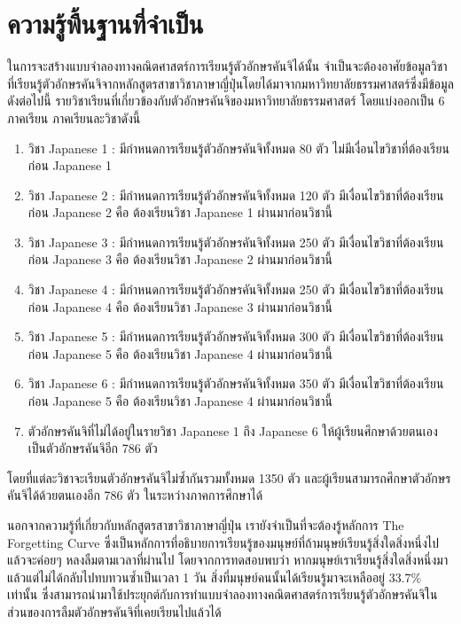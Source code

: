 \documentclass{article}
\begin{document}
\section{ความรู้พื้นฐานที่จำเป็น}
ในการจะสร้างแบบจำลองทางคณิตศาสตร์การเรียนรู้ตัวอักษรคันจิได้นั้น จำเป็นจะต้องอาศัยข้อมูลวิชาที่เรียนรู้ตัวอักษรคันจิจากหลักสูตรสาขาวิชาภาษาญี่ปุ่นโดยได้มาจากมหาวิทยาลัยธรรมศาสตร์ซึ่งมีข้อมูลดังต่อไปนี้ 
\break
รายวิชาเรียนที่เกี่ยวข้องกับตัวอักษรคันจิของมหาวิทยาลัยธรรมศาสตร์ โดยแบ่งออกเป็น 6 ภาคเรียน ภาคเรียนละวิชาดังนี้
\begin{enumerate}
	\item วิชา Japanese 1 : มีกำหนดการเรียนรู้ตัวอักษรคันจิทั้งหมด 80 ตัว ไม่มีเงื่อนไขวิชาที่ต้องเรียนก่อน Japanese 1
	\item วิชา Japanese 2 : มีกำหนดการเรียนรู้ตัวอักษรคันจิทั้งหมด 120 ตัว มีเงื่อนไขวิชาที่ต้องเรียนก่อน Japanese 2 คือ ต้องเรียนวิชา Japanese 1 ผ่านมาก่อนวิชานี้
	\item วิชา Japanese 3 : มีกำหนดการเรียนรู้ตัวอักษรคันจิทั้งหมด 250 ตัว มีเงื่อนไขวิชาที่ต้องเรียนก่อน Japanese 3 คือ ต้องเรียนวิชา Japanese 2 ผ่านมาก่อนวิชานี้
	\item วิชา Japanese 4 : มีกำหนดการเรียนรู้ตัวอักษรคันจิทั้งหมด 250 ตัว มีเงื่อนไขวิชาที่ต้องเรียนก่อน Japanese 4 คือ ต้องเรียนวิชา Japanese 3 ผ่านมาก่อนวิชานี้
	\item วิชา Japanese 5 : มีกำหนดการเรียนรู้ตัวอักษรคันจิทั้งหมด 300 ตัว มีเงื่อนไขวิชาที่ต้องเรียนก่อน Japanese 5 คือ ต้องเรียนวิชา Japanese 4 ผ่านมาก่อนวิชานี้
	\item วิชา Japanese 6 : มีกำหนดการเรียนรู้ตัวอักษรคันจิทั้งหมด 350 ตัว มีเงื่อนไขวิชาที่ต้องเรียนก่อน Japanese 5 คือ ต้องเรียนวิชา Japanese 4 ผ่านมาก่อนวิชานี้
	\item ตัวอักษรคันจิที่ไม่ได้อยู่ในรายวิชา Japanese 1 ถึง Japanese 6 ให้ผู้เรียนศึกษาด้วยตนเองเป็นตัวอักษรคันจิอีก 786 ตัว
\end{enumerate}
โดยที่แต่ละวิชาจะเรียนตัวอักษรคันจิไม่ซ้ำกันรวมทั้งหมด 1350 ตัว และผู้เรียนสามารถศึกษาตัวอักษรคันจิได้ด้วยตนเองอีก 786 ตัว ในระหว่างภาคการศึกษาได้

นอกจากความรู้ที่เกี่ยวกับหลักสูตรสาขาวิชาภาษาญี่ปุ่น เรายังจำเป็นที่จะต้องรู้หลักการ The Forgetting Curve\cite{ebbinghaus1913memory} ซึ่งเป็นหลักการที่อธิบายการเรียนรู้ของมนุษย์ที่ถ้ามนุษย์เรียนรู้สิ่งใดสิ่งหนึ่งไปแล้วจะค่อยๆ หลงลืมตามเวลาที่ผ่านไป โดยจากการทดสอบพบว่า หากมนุษย์เราเรียนรู้สิ่งใดสิ่งหนึ่งมาแล้วแต่ไม่ได้กลับไปทบทวนซ้ำเป็นเวลา 1 วัน สิ่งที่มนุษย์คนนั้นได้เรียนรู้มาจะเหลืออยู่ 33.7\% เท่านั้น ซึ่งสามารถนำมาใช้ประยุกต์กับการทำแบบจำลองทางคณิตศาสตร์การเรียนรู้ตัวอักษรคันจิในส่วนของการลืมตัวอักษรคันจิที่เคยเรียนไปแล้วได้
\end{document}
